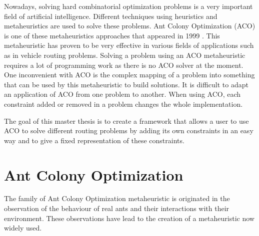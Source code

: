 Nowadays, solving hard combinatorial optimization problems is a very important field of artificial intelligence. Different techniques using heuristics and metaheuristics are used to solve these problems. Ant Colony Optimization (ACO) is one of these metaheuristics approaches that appeared in 1999 \cite{dorigo1999ant} \cite{corne1999ant}. This metaheuristic has proven to be very effective in various fields of applications such as in vehicle routing problems. Solving a problem using an ACO metaheuristic requires a lot of programming work as there is no ACO solver at the moment. One inconvenient with ACO is the complex mapping of a problem into something that can be used by this metaheuristic to build solutions. It is difficult to adapt an application of ACO from one problem to another. When using ACO, each constraint added or removed in a problem changes the whole implementation. 

The goal of this master thesis is to create a framework that allows a user to use ACO to solve different routing problems by adding its own constraints in an easy way and to give a fixed representation of these constraints.

\section{Ant Colony Optimization}\label{whatisACO}
The family of Ant Colony Optimization metaheuristic is originated in the observation of the behaviour of real ants and their interactions with their environment. These observations have lead to the creation of a metaheuristic now widely used.

